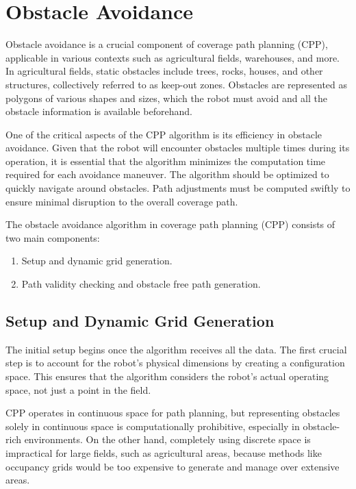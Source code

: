 
\section{Obstacle Avoidance}


Obstacle avoidance is a crucial component of coverage path planning (CPP), applicable in various contexts such as agricultural fields, warehouses, and more. In agricultural fields, static obstacles include trees, rocks, houses, and other structures, collectively referred to as keep-out zones. Obstacles are represented as polygons of various shapes and sizes, which the robot must avoid and all the obstacle information is available beforehand. 

\vspace{3mm}  

One of the critical aspects of the CPP algorithm is its efficiency in obstacle avoidance. Given that the robot will encounter obstacles multiple times during its operation, it is essential that the algorithm minimizes the computation time required for each avoidance maneuver. The algorithm should be optimized to quickly navigate around obstacles. Path adjustments must be computed swiftly to ensure minimal disruption to the overall coverage path. 


\vspace{3mm}  


The obstacle avoidance algorithm in coverage path planning (CPP) consists of two main components:

\begin{enumerate}
    \setlength\itemsep{0em}
    \item Setup and dynamic grid generation.
    \item Path validity checking and obstacle free path generation.
\end{enumerate}

\subsection{Setup and Dynamic Grid Generation}

The initial setup begins once the algorithm receives all the data. The first crucial step is to account for the robot's physical dimensions by creating a configuration space. This ensures that the algorithm considers the robot's actual operating space, not just a point in the field.

\vspace{3mm}  

CPP operates in continuous space for path planning, but representing obstacles solely in continuous space is computationally prohibitive, especially in obstacle-rich environments. On the other hand, completely using discrete space is impractical for large fields, such as agricultural areas, because methods like occupancy grids would be too expensive to generate and manage over extensive areas.


